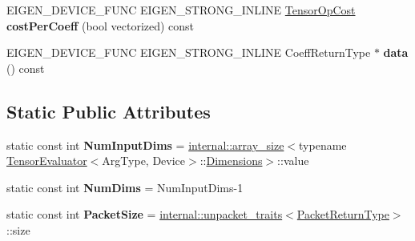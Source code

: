 \begin{DoxyCompactItemize}
\item 
\mbox{\label{struct_eigen_1_1_tensor_evaluator_3_01const_01_tensor_chipping_op_3_01_dim_id_00_01_arg_type_01_4_00_01_device_01_4_a702680a8fd84b5ce6d7f700e0fe26652}} 
E\+I\+G\+E\+N\+\_\+\+D\+E\+V\+I\+C\+E\+\_\+\+F\+U\+NC E\+I\+G\+E\+N\+\_\+\+S\+T\+R\+O\+N\+G\+\_\+\+I\+N\+L\+I\+NE \hyperlink{class_eigen_1_1_tensor_op_cost}{Tensor\+Op\+Cost} {\bfseries cost\+Per\+Coeff} (bool vectorized) const
\item 
\mbox{\label{struct_eigen_1_1_tensor_evaluator_3_01const_01_tensor_chipping_op_3_01_dim_id_00_01_arg_type_01_4_00_01_device_01_4_a778fcc336b9cebf28f69fd832d894fd1}} 
E\+I\+G\+E\+N\+\_\+\+D\+E\+V\+I\+C\+E\+\_\+\+F\+U\+NC E\+I\+G\+E\+N\+\_\+\+S\+T\+R\+O\+N\+G\+\_\+\+I\+N\+L\+I\+NE Coeff\+Return\+Type $\ast$ {\bfseries data} () const
\end{DoxyCompactItemize}
\subsection*{Static Public Attributes}
\begin{DoxyCompactItemize}
\item 
\mbox{\label{struct_eigen_1_1_tensor_evaluator_3_01const_01_tensor_chipping_op_3_01_dim_id_00_01_arg_type_01_4_00_01_device_01_4_abc494cee94ad0e22c2e36ba023f16664}} 
static const int {\bfseries Num\+Input\+Dims} = \hyperlink{struct_eigen_1_1internal_1_1array__size}{internal\+::array\+\_\+size}$<$typename \hyperlink{struct_eigen_1_1_tensor_evaluator}{Tensor\+Evaluator}$<$Arg\+Type, Device$>$\+::\hyperlink{struct_eigen_1_1_d_sizes}{Dimensions}$>$\+::value
\item 
\mbox{\label{struct_eigen_1_1_tensor_evaluator_3_01const_01_tensor_chipping_op_3_01_dim_id_00_01_arg_type_01_4_00_01_device_01_4_a7e85a466071f2977de6b4314cbaf1997}} 
static const int {\bfseries Num\+Dims} = Num\+Input\+Dims-\/1
\item 
\mbox{\label{struct_eigen_1_1_tensor_evaluator_3_01const_01_tensor_chipping_op_3_01_dim_id_00_01_arg_type_01_4_00_01_device_01_4_a58c76789e11a64b65af92aab8b1c5c14}} 
static const int {\bfseries Packet\+Size} = \hyperlink{struct_eigen_1_1internal_1_1unpacket__traits}{internal\+::unpacket\+\_\+traits}$<$\hyperlink{group___sparse_core___module}{Packet\+Return\+Type}$>$\+::size
\end{DoxyCompactItemize}
